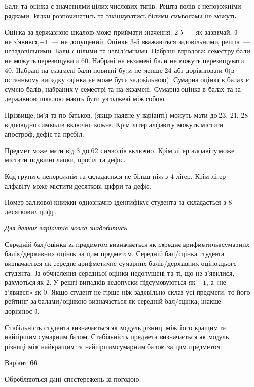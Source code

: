 \documentclass[11pt, ukrainian]{article}
\begin{document}
Бали та оцінка є значеннями цілих числових типів. Решта полів є непорожніми рядками.
Рядки розпочинатись та закінчуватись білими символами не можуть.

Оцінка за державною шкалою може приймати значення: 2-5~--- як зазвичай, 0~--- не з’явився,$-1$~--- не допущений. 
Оцінки 3-5 вважаються задовільними, решта~--- незадовільними. 
Бали є цілими та невід’ємними.
Набрані впродовж семестру бали не можуть перевищувати 60. 
Набрані на екзамені бали не можуть перевищувати 40. 
Набрані на екзамені бали повинні бути не менше 24 або дорівнювати 0(в останньому випадку оцінка не може бути задовільною). 
Сумарна оцінка в балах є сумою балів, набраних у семестрі та на екзамені.
Сумарна оцінка в балах та за державною шкалою мають бути узгоджені між собою.

Прізвище, ім’я та по-батькові (якщо наявне у варіанті) можуть мати до 23, 21, 28 відповідно символів включно кожне. 
Крім літер алфавіту можуть містити апостроф, дефіс та пробіл.

Предмет може мати від 3 до 62 символів включно. 
Крім літер алфавіту може містити подвійні лапки, пробіл та дефіс.

Код групи є непорожнім та складається не більш ніж з 4 літер. 
Крім літер алфавіту може містити десяткові цифри та дефіс.


Номер залікової книжки однозначно ідентифікує студента та складається з 8 десяткових цифр. 

\bigskip\textit{Для деяких варіантів може знадобитись}

Середній бал/оцінка за предметом визначається як середнє арифметичнесумарних балів/державних оцінок за цим предметом. 
Середній бал/оцінка студента визначається як середнє арифметичне сумарних балів/державних оцінокцього студента. 
За обчислення середньої оцінки недопущені та ті, що не з’явилися, рахуються як 2.
У решті випадків недопуски підсумовуються як $-1$, а «не з’явився» як 0.
Якщо студент не гірше ніж задовільно склав усі предмети, 
то його рейтинг за балами/оцінкою визначається як середній бал/оцінка; інакше дорівнює 0.

Стабільність студента визначається як модуль різниці між його кращим та найгіршим сумарним балом.
Стабільність предмета визначається як модуль різниці між найкращим та найгіршимсумарним балом за цим предметом.






\par
\newpage
{\center Варіант  \No \textbf { 66 }\par}
\bigskip
Обробляються дані спостережень за погодою. 
\end{document}
